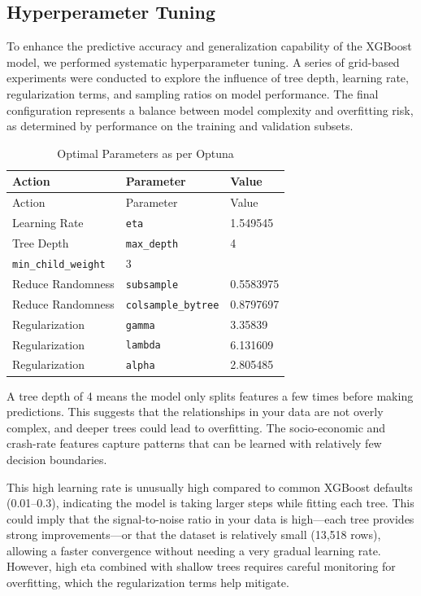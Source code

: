 \documentclass[
  number,
  review,
  3p]{elsarticle}
\begin{document}
\subsection{\texorpdfstring{\textbf{Hyperperameter
Tuning}}{Hyperperameter Tuning}}\label{hyperperameter-tuning}

To enhance the predictive accuracy and generalization capability of the
XGBoost model, we performed systematic hyperparameter tuning. A series
of grid-based experiments were conducted to explore the influence of
tree depth, learning rate, regularization terms, and sampling ratios on
model performance. The final configuration represents a balance between
model complexity and overfitting risk, as determined by performance on
the training and validation subsets.

\begin{longtable}[]{@{}lll@{}}
\caption{Optimal Parameters as per Optuna}\tabularnewline
\toprule\noalign{}
Action & Parameter & Value \\
\midrule\noalign{}
\endfirsthead
\toprule\noalign{}
Action & Parameter & Value \\
\midrule\noalign{}
\endhead
\bottomrule\noalign{}
\endlastfoot
Learning Rate & \texttt{eta} & 1.549545 \\
Tree Depth & \texttt{max\_depth} & 4 \\
\texttt{min\_child\_weight} & 3 & \\
Reduce Randomness & \texttt{subsample} & 0.5583975 \\
Reduce Randomness & \texttt{colsample\_bytree} & 0.8797697 \\
Regularization & \texttt{gamma} & 3.35839 \\
Regularization & \texttt{lambda} & 6.131609 \\
Regularization & \texttt{alpha} & 2.805485 \\
\end{longtable}

A tree depth of 4 means the model only splits features a few times
before making predictions. This suggests that the relationships in your
data are not overly complex, and deeper trees could lead to overfitting.
The socio-economic and crash-rate features capture patterns that can be
learned with relatively few decision boundaries.

This high learning rate is unusually high compared to common XGBoost
defaults (0.01--0.3), indicating the model is taking larger steps while
fitting each tree. This could imply that the signal-to-noise ratio in
your data is high---each tree provides strong improvements---or that the
dataset is relatively small (13,518 rows), allowing a faster convergence
without needing a very gradual learning rate. However, high eta combined
with shallow trees requires careful monitoring for overfitting, which
the regularization terms help mitigate.
\end{document}
